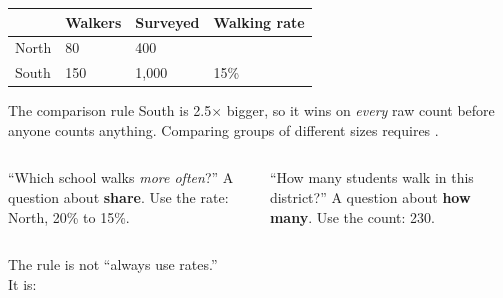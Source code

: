 \documentclass[aspectratio=169, 11pt]{beamer}
\begin{document}
\begin{frame}[t, plain]
  \vspace{4pt}
  \renewcommand{\arraystretch}{1.45}
  \begin{tabularx}{\textwidth}{@{} l C{2.6cm} C{2.6cm} X @{}}
    \hline
    & \textbf{Walkers} & \textbf{Surveyed} & \textbf{Walking rate} \\
    \hline
    North &  80 &   400 &  \\
    South & 150 & 1,000 & 15\% \\
    \hline
  \end{tabularx}
  \vspace{12pt}
  \begin{block}{The comparison rule}
    South is 2.5$\times$ bigger, so it wins on \emph{every} raw count before anyone counts
    anything. Comparing groups of different sizes requires .
  \end{block}
\end{frame}

\begin{frame}[t, plain]
  \vspace{10pt}
  \begin{columns}[t]
    \begin{column}{0.46\textwidth}
      \begin{block}{``Which school walks \emph{more often}?''}
        A question about \textbf{share}. Use the rate: North, 20\% to 15\%.
      \end{block}
    \end{column}
    \begin{column}{0.46\textwidth}
      \begin{block}{``How many students walk in this district?''}
        A question about \textbf{how many}. Use the count: 230.
      \end{block}
    \end{column}
  \end{columns}
  \vspace{16pt}
  \begin{center}
    {\large The rule is not ``always use rates.''}\\[8pt]
    {\small\color{slate} It is: }
  \end{center}
\end{frame}
\end{document}
